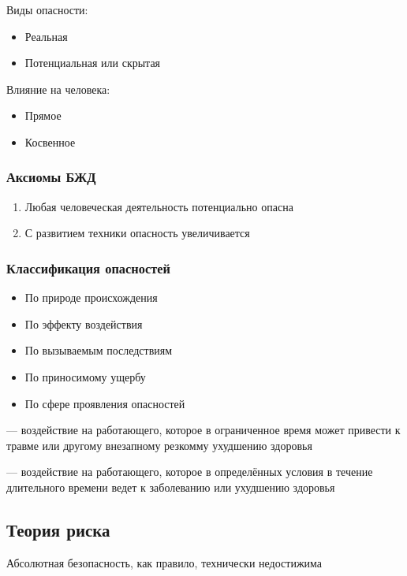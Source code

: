 \documentclass[a4paper, 14pt]{extarticle}
\begin{document}
Виды опасности:
\begin{itemize}
    \item Реальная
    \item Потенциальная или скрытая
\end{itemize}

Влияние на человека:
\begin{itemize}
    \item Прямое
    \item Косвенное
\end{itemize}

\subsubsection*{Аксиомы БЖД}
\begin{enumerate}
    \item Любая человеческая деятельность потенциально опасна
    \item С развитием техники опасность увеличивается
\end{enumerate}

\subsubsection*{Классификация опасностей}
\begin{itemize}
    \item По природе происхождения
    \item По эффекту воздействия
    \item По вызываемым последствиям
    \item По приносимому ущербу
    \item По сфере проявления опасностей
\end{itemize}

 --- воздействие на работающего, которое в ограниченное время может привести к травме или другому внезапному резкомму ухудшению здоровья

 --- воздействие на работающего, которое в определённых условия в течение длительного времени ведет к заболеванию или ухудшению здоровья

\subsection{Теория риска}
Абсолютная безопасность, как правило, технически недостижима
\end{document}
